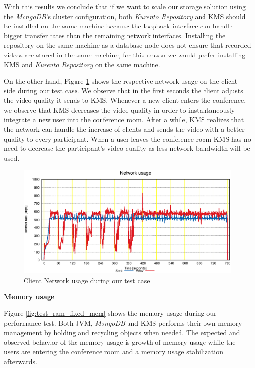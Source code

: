\documentclass[conference,compsoc,a4paper]{IEEEtran}
\begin{document}
	With this results we conclude that if we want to scale our storage solution using the \emph{MongoDB}'s cluster configuration, both \emph{Kurento Repository} and \gls{KMS} should be installed on the same machine because the loopback interface can handle bigger transfer rates than the remaining network interfaces. Installing the repository on the same machine as a database node does not ensure that recorded videos are stored in the same machine, for this reason we would prefer installing \gls{KMS} and \emph{Kurento Repository} on the same machine.





On the other hand, Figure \ref{fig:test_client_net} shows the respective network usage on the client side during our test case. We observe that in the first seconds the client adjusts the video quality it sends to \gls{KMS}. Whenever a new client enters the conference, we observe that \gls{KMS} decreases the video quality in order to instantaneously integrate a new user into the conference room. After a while, \gls{KMS} realizes that the network can handle the increase of clients and sends the video with a better quality to every participant. When a user leaves the conference room \gls{KMS} has no need to decrease the participant's video quality as less network bandwidth will be used.

\begin{figure}
  \centering
  \includegraphics[width=\linewidth]{stats/test_client_net.eps}
  \caption{Client Network usage during our test case}
  \label{fig:test_client_net}
\end{figure}



\textbf{Memory usage}


Figure \ref{fig:test_ram_fixed_mem} shows the memory usage during our performance test. Both \gls{JVM}, \emph{MongoDB} and \gls{KMS} performs their own memory management by holding and recycling objects when needed. The expected and observed behavior of the memory usage is growth of memory usage while the users are entering the conference room and a memory usage stabilization afterwards.
\end{document}
